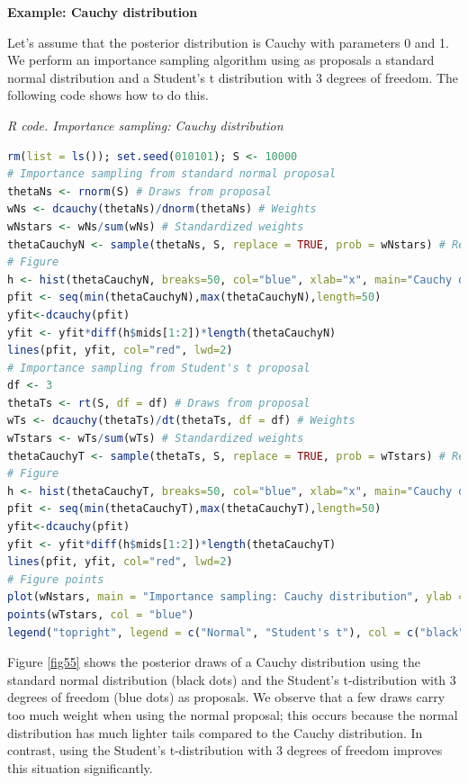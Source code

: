 \textbf{Example: Cauchy distribution}

Let's assume that the posterior distribution is Cauchy with parameters 0 and 1. We perform an importance sampling algorithm using as proposals a standard normal distribution and a Student's t distribution with 3 degrees of freedom. The following code shows how to do this.

\begin{tcolorbox}[enhanced,width=4.67in,center upper,
	fontupper=\large\bfseries,drop shadow southwest,sharp corners]
	\textit{R code. Importance sampling: Cauchy distribution}
	\begin{VF}
		\begin{lstlisting}[language=R]
rm(list = ls()); set.seed(010101); S <- 10000
# Importance sampling from standard normal proposal 
thetaNs <- rnorm(S) # Draws from proposal
wNs <- dcauchy(thetaNs)/dnorm(thetaNs) # Weights
wNstars <- wNs/sum(wNs) # Standardized weights
thetaCauchyN <- sample(thetaNs, S, replace = TRUE, prob = wNstars) # Resampling
# Figure
h <- hist(thetaCauchyN, breaks=50, col="blue", xlab="x", main="Cauchy draws from importance sampling: Normal standard proposal")
pfit <- seq(min(thetaCauchyN),max(thetaCauchyN),length=50)
yfit<-dcauchy(pfit)
yfit <- yfit*diff(h$mids[1:2])*length(thetaCauchyN)
lines(pfit, yfit, col="red", lwd=2)
# Importance sampling from Student's t proposal 
df <- 3
thetaTs <- rt(S, df = df) # Draws from proposal
wTs <- dcauchy(thetaTs)/dt(thetaTs, df = df) # Weights
wTstars <- wTs/sum(wTs) # Standardized weights
thetaCauchyT <- sample(thetaTs, S, replace = TRUE, prob = wTstars) # Resampling
# Figure
h <- hist(thetaCauchyT, breaks=50, col="blue", xlab="x", main="Cauchy draws from importance sampling: Student's t proposal")
pfit <- seq(min(thetaCauchyT),max(thetaCauchyT),length=50)
yfit<-dcauchy(pfit)
yfit <- yfit*diff(h$mids[1:2])*length(thetaCauchyT)
lines(pfit, yfit, col="red", lwd=2)
# Figure points
plot(wNstars, main = "Importance sampling: Cauchy distribution", ylab = "Weights", xlab = "Iterations")
points(wTstars, col = "blue")
legend("topright", legend = c("Normal", "Student's t"), col = c("black", "blue"), pch = c(1, 1))
\end{lstlisting}
	\end{VF}
\end{tcolorbox} 

Figure \ref{fig55} shows the posterior draws of a Cauchy distribution using the standard normal distribution (black dots) and the Student's t-distribution with 3 degrees of freedom (blue dots) as proposals. We observe that a few draws carry too much weight when using the normal proposal; this occurs because the normal distribution has much lighter tails compared to the Cauchy distribution. In contrast, using the Student's t-distribution with 3 degrees of freedom improves this situation significantly.

